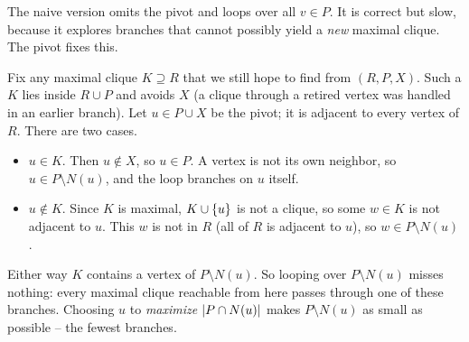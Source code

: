 The naive version omits the pivot and loops over all $v\in P$. It is correct but slow, because it explores branches that cannot possibly yield a
\emph{new} maximal clique. The pivot fixes this.

\begin{whybox}
Fix any maximal clique $K\supseteq R$ that we still hope to find from $(R,P,X)$.
Such a $K$ lies inside $R\cup P$ and avoids $X$ (a clique through a retired vertex
was handled in an earlier branch). Let $u\in P\cup X$ be the pivot; it is adjacent
to every vertex of $R$. There are two cases.
\begin{itemize}
  \item $u\in K$. Then $u\notin X$, so $u\in P$. A vertex is not its own neighbor,
        so $u\in P\setminus N(u)$, and the loop branches on $u$ itself.
  \item $u\notin K$. Since $K$ is maximal, $K\cup\{u\}$ is not a clique, so some
        $w\in K$ is not adjacent to $u$. This $w$ is not in $R$ (all of $R$ is
        adjacent to $u$), so $w\in P\setminus N(u)$.
\end{itemize}
Either way $K$ contains a vertex of $P\setminus N(u)$. So looping over
$P\setminus N(u)$ misses nothing: every maximal clique reachable from here
passes through one of these branches. Choosing $u$ to \emph{maximize}
$\lvert P\cap N(u)\rvert$ makes $P\setminus N(u)$ as small as possible -- the fewest
branches.
\end{whybox}

